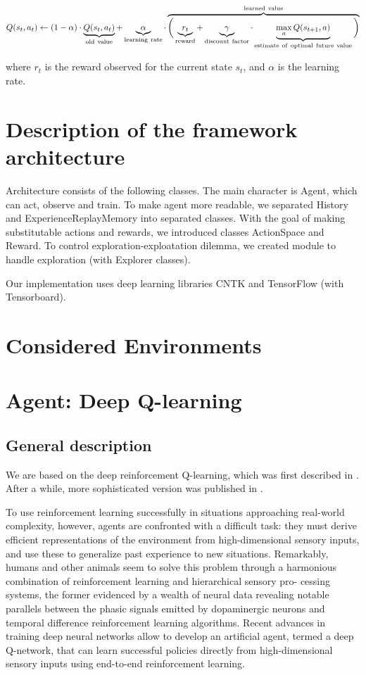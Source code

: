\documentclass{article}
\begin{document}
$$Q(s_{t},a_{t}) \leftarrow (1-\alpha) \cdot 
\underbrace{Q(s_{t},a_{t})}_{\rm old~value} + 
\underbrace{\alpha}_{\rm learning~rate} \cdot  
\overbrace{\bigg( \underbrace{r_{t}}_{\rm reward} + 
\underbrace{\gamma}_{\rm discount~factor} \cdot 
\underbrace{\max_{a}Q(s_{t+1}, a)}_{\rm 
estimate~of~optimal~future~value} \bigg) }^{\rm learned~value} $$

where $r_{t}$ is the reward observed for the current state 
$s_t$, and $\alpha$ is the learning rate.


\section{Description of the framework architecture}

Architecture consists of the following classes. The main character is 
Agent, which can act, observe and train.
To make agent more readable, we separated History and 
ExperienceReplayMemory into separated classes.
With the goal of making substitutable actions and rewards, 
we introduced classes ActionSpace and Reward.
To control exploration-exploatation dilemma, we created module to 
handle exploration (with Explorer classes).

Our implementation uses deep learning libraries CNTK 
and TensorFlow (with Tensorboard).

\section{Considered Environments}

\section{Agent: Deep Q-learning}

\subsection{General description} 

We are based on the deep reinforcement
Q-learning, which was first described in \cite{mnih2013playing}.
After a while, more sophisticated version was published in 
\cite{mnih2015humanlevel}.

 To use reinforcement learning successfully in situations
approaching real-world complexity, however, agents are confronted
with a difficult task: they must derive efficient representations of the
environment from high-dimensional sensory inputs, and use these
to generalize past experience to new situations. Remarkably, humans
and other animals seem to solve this problem through a harmonious
combination of reinforcement learning and hierarchical sensory pro-
cessing systems, the former evidenced by a wealth of neural data
revealing notable parallels between the phasic signals emitted by 
dopaminergic neurons and temporal difference reinforcement learning
algorithms. Recent advances in training deep neural networks allow to
develop an artificial agent, termed a deep Q-network, that can
learn successful policies directly from high-dimensional sensory inputs
using end-to-end reinforcement learning. 
\end{document}
